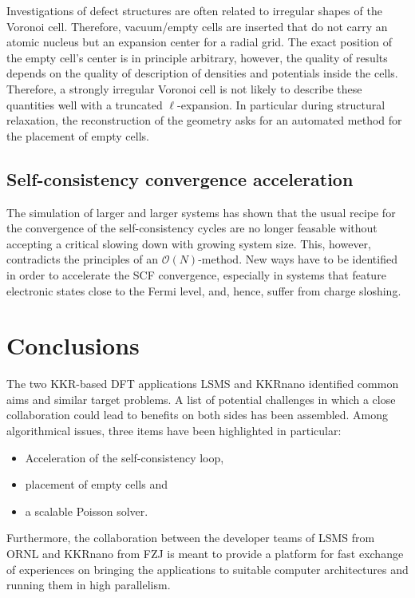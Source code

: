 \documentclass{llncs}
\def\KKRnano{{KKRnano}}
\def\LSMS{{LSMS}}
\begin{document}
Investigations of defect structures are often related to irregular
shapes of the Voronoi cell. Therefore, vacuum/empty cells are inserted that do not carry an atomic nucleus
but an expansion center for a radial grid.
The exact position of the empty cell's center is in principle arbitrary, however, the quality of results
depends on the quality of description of densities and potentials inside the cells. Therefore,
a strongly irregular Voronoi cell is not likely to describe these quantities well with a truncated $\ell$-expansion.
In particular during structural relaxation, the reconstruction of the geometry
asks for an automated method for the placement of empty cells.


\subsection{Self-consistency convergence acceleration} %

The simulation of larger and larger systems has shown that the usual recipe for the
convergence of the self-consistency cycles are no longer feasable without accepting a critical
slowing down with growing system size. 
This, however, contradicts the principles of an $\mathcal O(N)$-method.
New ways have to be identified in order to accelerate the SCF convergence, especially in systems
that feature electronic states close to the Fermi level, and, hence, suffer from charge sloshing.


\section{Conclusions}\label{section:summary}

The two KKR-based DFT applications \LSMS{} and \KKRnano{} identified common aims and similar target problems.
A list of potential challenges in which a close collaboration could lead to benefits on both sides has been assembled. 
Among algorithmical issues, three items have been highlighted in particular: 
\begin{itemize}
 \item Acceleration of the self-consistency loop,
 \item placement of empty cells and
 \item a scalable Poisson solver.
\end{itemize}
Furthermore, the collaboration between the developer teams of 
\LSMS{} from ORNL 
and
\KKRnano{} from FZJ
is meant to provide a platform for fast exchange of experiences on
bringing the applications to suitable computer architectures and running them in high parallelism.
\end{document}
